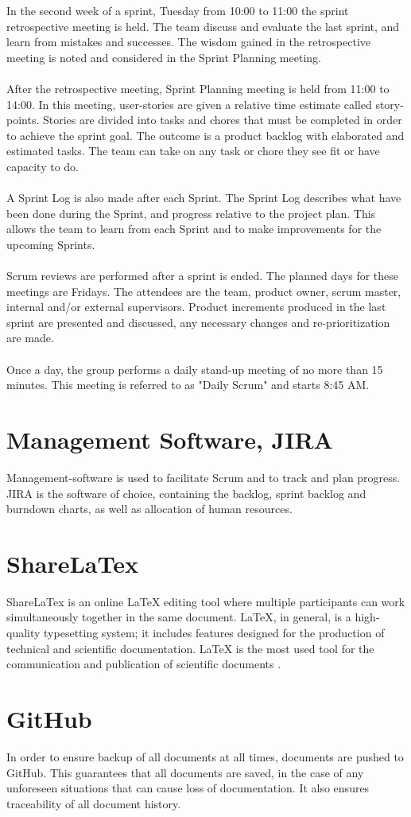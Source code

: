 In the second week of a sprint, Tuesday from 10:00 to 11:00 the sprint retrospective meeting is held. The team discuss and evaluate the last sprint, and learn from mistakes and successes. The wisdom gained in the retrospective meeting is noted and considered in the Sprint Planning meeting.
\\\\
After the retrospective meeting, Sprint Planning meeting is held from 11:00 to 14:00. In this meeting, user-stories are given a relative time estimate called  story-points. Stories are divided into tasks and chores that must be completed in order to achieve the sprint goal. The outcome is a product backlog with elaborated and estimated tasks. The team can take on any task or chore they see fit or have capacity to do. 
\\\\
A Sprint Log is also made after each Sprint. The Sprint Log describes what have been done during the Sprint, and progress relative to the project plan. This allows the team to learn from each Sprint and to make improvements for the upcoming Sprints. 
\\\\
Scrum reviews are performed after a sprint is ended. The planned days for these meetings are Fridays. The attendees are the team, product owner, scrum master, internal and/or external supervisors. Product increments produced in the last sprint are presented and discussed, any necessary changes and re-prioritization are made.
\\\\
Once a day, the group performs a daily stand-up meeting of no more than 15 minutes. This meeting is referred to as "Daily Scrum" and starts 8:45 AM. 

\clearpage

\section{Management Software, JIRA}
Management-software is used to facilitate Scrum and to track and plan progress. JIRA is the software of choice, containing the backlog, sprint backlog and burndown charts, as well as allocation of human resources.


\section{ShareLaTex}
ShareLaTex is an online LaTeX editing tool where multiple participants can work simultaneously together in the same document. LaTeX, in general, is a high-quality typesetting system; it includes features designed for the production of technical and scientific documentation. LaTeX is the most used tool for the communication and publication of scientific documents \cite{latex}.  


\section{GitHub}
In order to ensure backup of all documents at all times, documents are pushed to GitHub. This guarantees that all documents are saved, in the case of any unforeseen situations that can cause loss of documentation. It also ensures traceability of all document history. 








